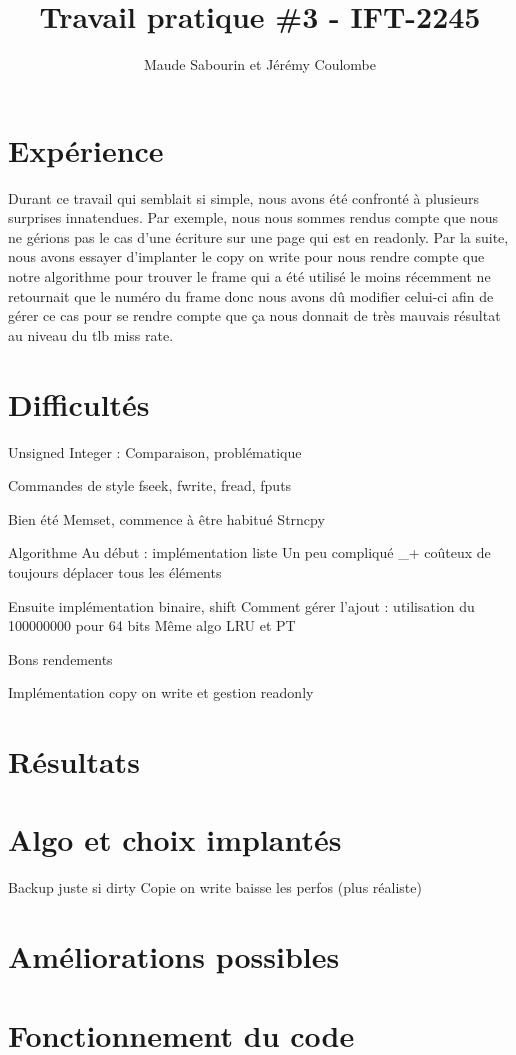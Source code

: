 \documentclass{article}
\title{Travail pratique \#3 - IFT-2245}
\author{Maude Sabourin et Jérémy Coulombe}
\begin{document}
\maketitle

\section{Expérience}
Durant ce travail qui semblait si simple, nous avons été confronté à plusieurs surprises innatendues. Par exemple, nous nous sommes rendus compte que nous ne gérions pas le cas d'une écriture sur une page qui est en readonly. Par la suite, nous avons essayer d'implanter le copy on write pour nous rendre compte que notre algorithme pour trouver le frame qui a été utilisé le moins récemment ne retournait que le numéro du frame donc nous avons dû modifier celui-ci afin de gérer ce cas pour se rendre compte que ça nous donnait de très mauvais résultat au niveau du tlb miss rate.

\section {Difficultés}
Unsigned Integer : Comparaison, problématique

Commandes de style fseek, fwrite, fread, fputs

Bien été
Memset, commence à être habitué
Strncpy

Algorithme
Au début : implémentation liste 
Un peu compliqué _+ coûteux de toujours déplacer tous les éléments

Ensuite implémentation binaire, shift
Comment gérer l’ajout : utilisation du 100000000 pour 64 bits 
Même algo LRU et PT

Bons rendements

Implémentation copy on write et gestion readonly

\section{Résultats}


\section{Algo et choix implantés}
Backup juste si dirty
Copie on write baisse les perfos (plus réaliste)
\section{Améliorations possibles}


\section{Fonctionnement du code}
\end{document}
